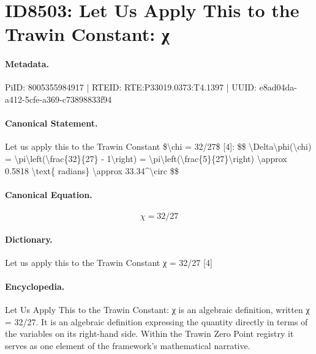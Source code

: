 \section*{ID8503: Let Us Apply This to the Trawin Constant: χ}
\paragraph{Metadata.}
PiID: 8005355984917 | RTEID: RTE:P33019.0373:T4.1397 | UUID: e8ad04da-a412-5cfe-a369-c73898833f94

\paragraph{Canonical Statement.}
Let us apply this to the Trawin Constant \$\textbackslash{}chi = 32/27\$ [4]: \$\$ \textbackslash{}Delta\textbackslash{}phi(\textbackslash{}chi) = \textbackslash{}pi\textbackslash{}left(\textbackslash{}frac\{32\}\{27\} - 1\textbackslash{}right) = \textbackslash{}pi\textbackslash{}left(\textbackslash{}frac\{5\}\{27\}\textbackslash{}right) \textbackslash{}approx 0.5818 \textbackslash{}text\{ radians\} \textbackslash{}approx 33.34\textasciicircum{}\textbackslash{}circ \$\$

\paragraph{Canonical Equation.}
\[
\chi = 32/27
\]

\paragraph{Dictionary.}
Let us apply this to the Trawin Constant χ = 32/27 [4]

\paragraph{Encyclopedia.}
Let Us Apply This to the Trawin Constant: χ is an algebraic definition, written χ = 32/27. It is an algebraic definition expressing the quantity directly in terms of the variables on its right-hand side. Within the Trawin Zero Point registry it serves as one element of the framework's mathematical narrative.
